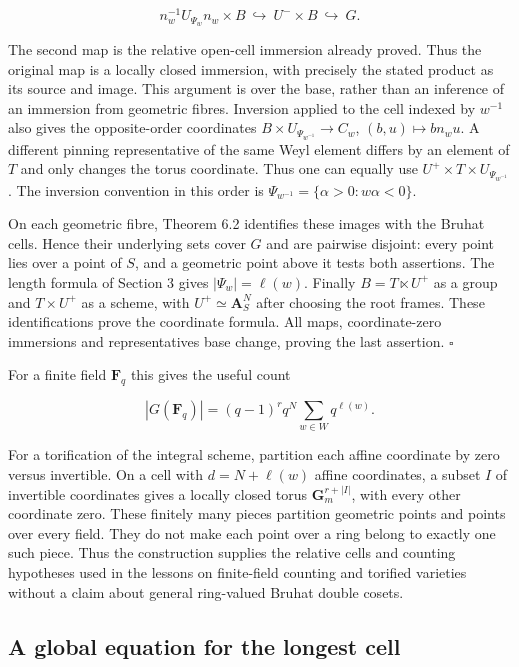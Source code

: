 \documentclass[11pt,a4paper,openany]{report}
\begin{document}
\[
n_w^{-1}U_{\Psi_w}n_w\times B\ \hookrightarrow\ U^-\times B\ \hookrightarrow\ G.
\]

The second map is the relative open-cell immersion already proved. Thus the original map is a locally closed immersion, with precisely the stated product as its source and image. This argument is over the base, rather than an inference of an immersion from geometric fibres. Inversion applied to the cell indexed by \(w^{-1}\) also gives the opposite-order coordinates \(B\times U_{\Psi_{w^{-1}}}\to C_w\), \((b,u)\mapsto bn_wu\). A different pinning representative of the same Weyl element differs by an element of \(T\) and only changes the torus coordinate. Thus one can equally use \(U^+\times T\times U_{\Psi_{w^{-1}}}\). The inversion convention in this order is \(\Psi_{w^{-1}}=\{\alpha>0:w\alpha<0\}\).

On each geometric fibre, Theorem 6.2 identifies these images with the Bruhat cells. Hence their underlying sets cover \(G\) and are pairwise disjoint: every point lies over a point of \(S\), and a geometric point above it tests both assertions. The length formula of Section 3 gives \(|\Psi_w|=\ell(w)\). Finally \(B=T\ltimes U^+\) as a group and \(T\times U^+\) as a scheme, with \(U^+\simeq\mathbf A_S^N\) after choosing the root frames. These identifications prove the coordinate formula. All maps, coordinate-zero immersions and representatives base change, proving the last assertion. \(\square\)

For a finite field \(\mathbf F_q\) this gives the useful count

\[
|G(\mathbf F_q)|=(q-1)^r q^N\sum_{w\in W}q^{\ell(w)}.
\]

For a torification of the integral scheme, partition each affine coordinate by zero versus invertible. On a cell with \(d=N+\ell(w)\) affine coordinates, a subset \(I\) of invertible coordinates gives a locally closed torus \(\mathbf G_m^{r+|I|}\), with every other coordinate zero. These finitely many pieces partition geometric points and points over every field. They do not make each point over a ring belong to exactly one such piece. Thus the construction supplies the relative cells and counting hypotheses used in the lessons on finite-field counting and torified varieties without a claim about general ring-valued Bruhat double cosets.

\subsection{A global equation for the longest cell}\label{AG-RG-04-a-global-equation-for-the-longest-cell}
\end{document}
